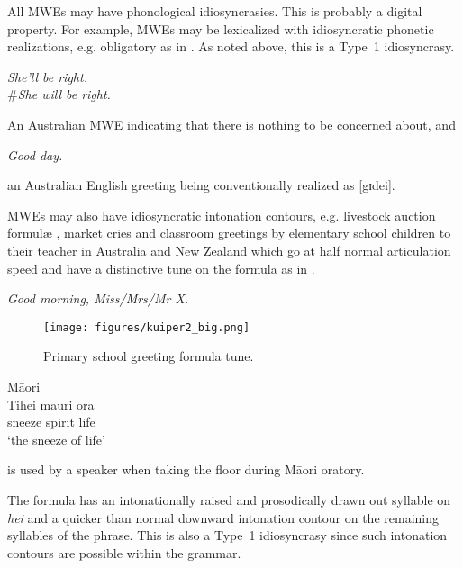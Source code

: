 \documentclass[output=paper]{langsci/langscibook}
\begin{document}
All MWEs may have phonological idiosyncrasies. This is probably a digital property. For example, MWEs may be lexicalized with idiosyncratic phonetic realizations, e.g. obligatory  as in . As noted above, this is a Type~1 idiosyncrasy.


\begin{exe}
\ex\label{ex:ex05} \textit{She’ll be right.}\\
	\#\textit{She will be right.}
\end{exe}

\noindent
An Australian MWE indicating that there is nothing to be concerned about, and

\begin{exe}
\ex\label{ex:ex06} \textit{Good day.}
\end{exe}

\noindent
an Australian English greeting being conventionally realized as [gɪdei]. 

MWEs may also have  idiosyncratic intonation contours, e.g. livestock auction formul\ae{} \citep{Kuiper1984}, market cries and classroom greetings by elementary school children to their teacher in Australia and New Zealand which go at half normal articulation speed and have a distinctive tune on the formula as in . 


\begin{exe}
\ex\label{ex:ex07} \textit{Good morning, Miss/Mrs/Mr X.} 
\end{exe}

\begin{figure}[h]
\texttt{[image: figures/kuiper2\_big.png]}
\caption{Primary school greeting formula tune.}
\label{fig:05:02}
\end{figure}


\ea\label{ex:ex08}
M\=aori\\
\gll Tihei   mauri ora\\
  sneeze spirit  life\\
\glt ‘the sneeze of life’
\z


\noindent {} is used by a speaker when taking the floor during M\=aori oratory.

The formula has an intonationally raised and prosodically drawn out syllable on \textit{hei} and a quicker than normal downward intonation contour on the remaining syllables of the phrase. This is also a Type~1 idiosyncrasy since such intonation contours are possible within the grammar. 
\end{document}
